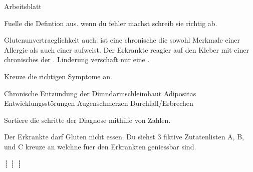 \documentclass[11pt,twoside,a4paper]{exam}
\begin{document}
\begin{center}
  \huge{Arbeitsblatt}
\end{center}
\begin{center}
\end{center}
\vspace{0.1in}

\begin{questions}
\question Fuelle die Defintion aus. wenn du fehler machst schreib sie richtig ab.

Glutenunvertraeglichkeit auch: \fillin ist eine chronische \fillin die sowohl Merkmale einer Allergie als auch einer \fillin aufweist.
Der Erkrankte reagier \fillin auf den Kleber \fillin mit einer chronisches \fillin der \fillin. Linderung verschaft
nur eine \fillin.
\end{questions}

\begin{questions}
\question
  Kreuze die richtigen Symptome an.
  \begin{checkboxes}
\choice Chronische Entzündung der Dünndarmschleimhaut
\choice Adipositas
\choice Entwicklungsstörungen
\choice Augenschmerzen
\choice Durchfall/Erbrechen
  \end{checkboxes}
\end{questions}

\begin{questions}
  \question Sortiere die schritte der Diagnose mithilfe von Zahlen.
  
  \begin{oneparcheckboxes}
  \end{oneparcheckboxes}
\end{questions}

\begin{center}
\end{center}

\vspace{0.1in}
\begin{questions}
  \question Der Erkrankte darf Gluten nicht essen. Du siehst 3 fiktive Zutatenlisten A, B, und C kreuze an welchne fuer den Erkrankten geniessbar sind.
     \begin{oneparcheckboxes}
     ┊ 
     ┊ 
  ┊    
     \end{oneparcheckboxes}
\end{questions}
\end{document}
